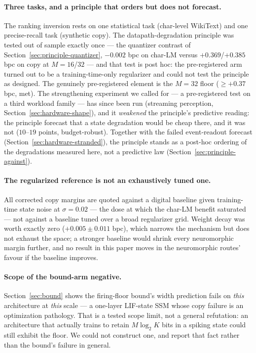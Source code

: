 \paragraph{Three tasks, and a principle that orders but does not forecast.}
The ranking inversion rests on one statistical task (char-level WikiText) and one
precise-recall task (synthetic copy). The datapath-degradation principle was tested
out of sample exactly once --- the quantizer contrast of
Section~\ref{sec:principle-quantizer}, $-0.002$ bpc on char-LM versus $+0.369$/$+0.385$
bpc on copy at $M{=}16$/$32$ --- and that test is post hoc: the pre-registered arm
turned out to be a training-time-only regularizer and could not test the principle as
designed. The genuinely pre-registered element is the $M{=}32$ floor
($\geq{+}0.37$ bpc, met). The strengthening experiment we called for --- a
pre-registered test on a third workload family --- has since been run (streaming
perception, Section~\ref{sec:hardware-shape}), and it \emph{weakened} the principle's
predictive reading: the principle forecast that a state degradation would be cheap
there, and it was not ($10$--$19$ points, budget-robust). Together with the failed
event-readout forecast (Section~\ref{sec:hardware-stranded}), the principle stands as a
post-hoc ordering of the degradations measured here, not a predictive law
(Section~\ref{sec:principle-against}).

\paragraph{The regularized reference is not an exhaustively tuned one.}
All corrected copy margins are quoted against a digital baseline given training-time
state noise at $\sigma{=}0.02$ --- the dose at which the char-LM benefit saturated ---
not against a baseline tuned over a broad regularizer grid. Weight decay was worth
exactly zero ($+0.005\pm0.011$ bpc), which narrows the mechanism but does not exhaust
the space; a stronger baseline would shrink every neuromorphic margin further, and no
result in this paper moves in the neuromorphic routes' favour if the baseline improves.

\paragraph{Scope of the bound-arm negative.}
Section~\ref{sec:bound} shows the firing-floor bound's width prediction fails on
\emph{this} architecture at \emph{this} scale --- a one-layer LIF-state SSM whose copy
failure is an optimization pathology. That is a tested scope limit, not a general
refutation: an architecture that actually trains to retain $M\log_2 K$ bits in a spiking
state could still exhibit the floor. We could not construct one, and report that fact
rather than the bound's failure in general.

